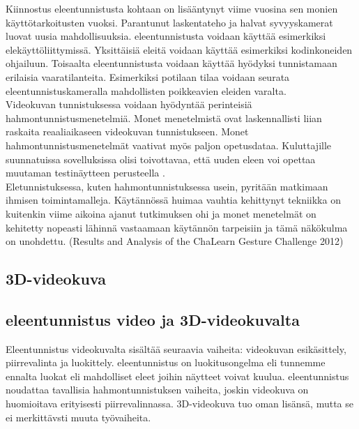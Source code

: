 Kiinnostus eleentunnistusta kohtaan on lisääntynyt viime vuosina sen monien käyttötarkoitusten vuoksi.
Parantunut laskentateho ja halvat syvyyskamerat luovat uusia mahdollisuuksia.\citep {6239178}
eleentunnistusta voidaan käyttää esimerkiksi elekäyttöliittymissä. \citep {1251144} Yksittäisiä eleitä voidaan käyttää esimerkiksi kodinkoneiden ohjailuun. Toisaalta eleentunnistusta voidaan käyttää hyödyksi tunnistamaan
erilaisia vaaratilanteita. Esimerkiksi potilaan tilaa voidaan seurata eleentunnistuskameralla mahdollisten poikkeavien eleiden varalta.
\\

Videokuvan tunnistuksessa voidaan hyödyntää perinteisiä hahmontunnistusmenetelmiä. Monet menetelmistä ovat laskennallisti liian raskaita 
reaaliaikaseen videokuvan tunnistukseen. \citep {1251144} Monet hahmontunnistusmenetelmät vaativat myös paljon opetusdataa. Kuluttajille suunnatuissa
sovelluksissa olisi toivottavaa, että uuden eleen voi opettaa muutaman testinäytteen perusteella \citep {1251144}.\\

Eletunnistuksessa, kuten hahmontunnistuksessa usein, pyritään matkimaan ihmisen toimintamalleja. Käytännössä huimaa vauhtia kehittynyt tekniikka on kuitenkin
viime aikoina ajanut tutkimuksen ohi ja monet menetelmät on kehitetty nopeasti lähinnä vastaamaan käytännön tarpeisiin ja tämä näkökulma on unohdettu. (Results and Analysis of the ChaLearn Gesture Challenge 2012)

\subsection{3D-videokuva}

\subsection{eleentunnistus video ja 3D-videokuvalta}

Eleentunnistus videokuvalta sisältää seuraavia vaiheita: videokuvan esikäsittely, piirrevalinta ja luokittely. eleentunnistus on luokitusongelma
eli tunnemme ennalta luokat eli mahdolliset eleet joihin näytteet voivat kuulua. eleentunnistus noudattaa tavallisia hahmontunnistuksen vaiheita, joskin
videokuva on huomioitava erityisesti piirrevalinnassa. 3D-videokuva tuo oman lisänsä, mutta se ei merkittävsti muuta työvaiheita. \\

